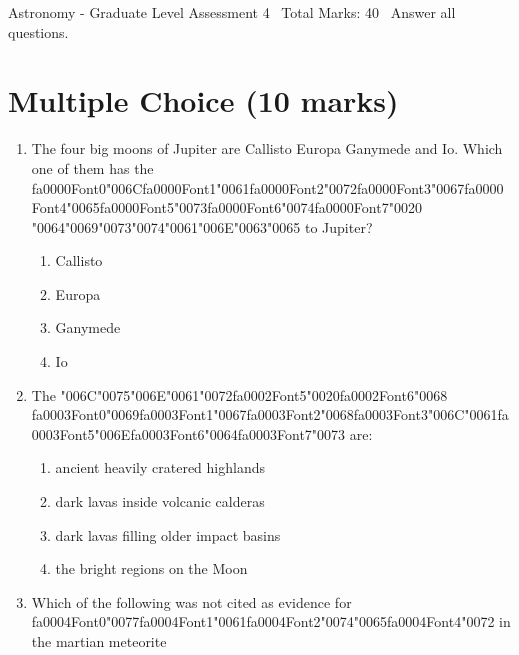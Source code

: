 \documentclass[12pt]{article}
\begin{document}
\begin{center}
Astronomy - Graduate Level Assessment 4 \
Total Marks: 40 \
Answer all questions.
\end{center}

\section*{Multiple Choice (10 marks)}
\begin{enumerate}[label=\arabic*.]
\item The four big moons of Jupiter are Callisto Europa Ganymede and Io. Which one of them has
the {\csname fa0000Font0\endcsname\char"006C}{\csname fa0000Font1\endcsname\char"0061}{\csname fa0000Font2\endcsname\char"0072}{\csname fa0000Font3\endcsname\char"0067}{\csname fa0000Font4\endcsname\char"0065}{\csname fa0000Font5\endcsname\char"0073}{\csname fa0000Font6\endcsname\char"0074}{\csname fa0000Font7\endcsname\char"0020} {\char"0064}{\char"0069}{\char"0073}{\char"0074}{\char"0061}{\char"006E}{\char"0063}{\char"0065} to Jupiter?
\begin{enumerate}[label=(\alph*)]
    \item Callisto
    \item Europa
    \item Ganymede
    \item Io
\end{enumerate}
\item The {\char"006C}{\char"0075}{\char"006E}{\char"0061}{\char"0072}{\csname fa0002Font5\endcsname\char"0020}{\csname fa0002Font6\endcsname\char"0068} {\csname fa0003Font0\endcsname\char"0069}{\csname fa0003Font1\endcsname\char"0067}{\csname fa0003Font2\endcsname\char"0068}{\csname fa0003Font3\endcsname\char"006C}{\char"0061}{\csname fa0003Font5\endcsname\char"006E}{\csname fa0003Font6\endcsname\char"0064}{\csname fa0003Font7\endcsname\char"0073} are:
\begin{enumerate}[label=(\alph*)]
    \item ancient heavily cratered highlands
    \item dark lavas inside volcanic calderas
    \item dark lavas filling older impact basins
    \item the bright regions on the Moon
\end{enumerate}
\item Which of the following was not cited as evidence for {\csname fa0004Font0\endcsname\char"0077}{\csname fa0004Font1\endcsname\char"0061}{\csname fa0004Font2\endcsname\char"0074}{\char"0065}{\csname fa0004Font4\endcsname\char"0072} in the martian meteorite

\end{enumerate}
\end{document}
